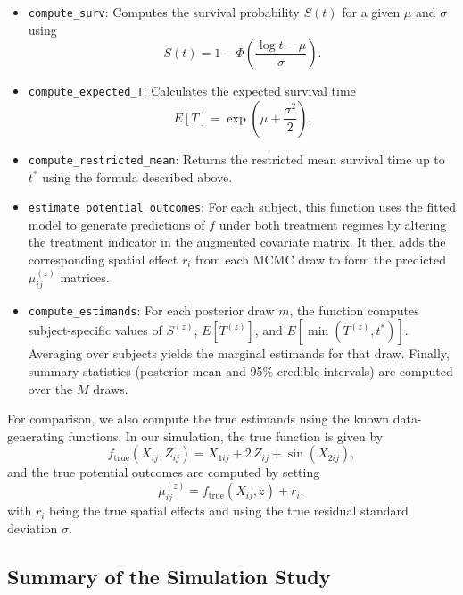 \documentclass[useAMS,referee]{biom}
\begin{document}
\begin{itemize}
    \item \texttt{compute\_surv}: Computes the survival probability \(S(t)\) for a given \(\mu\) and \(\sigma\) using
    \[
    S(t) = 1 - \Phi\left(\frac{\log t - \mu}{\sigma}\right).
    \]
    \item \texttt{compute\_expected\_T}: Calculates the expected survival time
    \[
    E[T] = \exp\left(\mu + \frac{\sigma^2}{2}\right).
    \]
    \item \texttt{compute\_restricted\_mean}: Returns the restricted mean survival time up to \(t^*\) using the formula described above.
    \item \texttt{estimate\_potential\_outcomes}: For each subject, this function uses the fitted model to generate predictions of \(f\) under both treatment regimes by altering the treatment indicator in the augmented covariate matrix. It then adds the corresponding spatial effect \(r_i\) from each MCMC draw to form the predicted \(\mu_{ij}^{(z)}\) matrices.
    \item \texttt{compute\_estimands}: For each posterior draw \(m\), the function computes subject-specific values of \(S^{(z)}\), \(E[T^{(z)}]\), and \(E[\min(T^{(z)},t^*)]\). Averaging over subjects yields the marginal estimands for that draw. Finally, summary statistics (posterior mean and 95\% credible intervals) are computed over the \(M\) draws.
\end{itemize}

For comparison, we also compute the true estimands using the known data-generating functions. In our simulation, the true function is given by
\[
f_{\text{true}}(X_{ij}, Z_{ij}) = X_{1ij} + 2\,Z_{ij} + \sin(X_{2ij}),
\]
and the true potential outcomes are computed by setting
\[
\mu_{ij}^{(z)} = f_{\text{true}}(X_{ij}, z) + r_i,
\]
with \(r_i\) being the true spatial effects and using the true residual standard deviation \(\sigma\).

\subsection{Summary of the Simulation Study}
\end{document}
